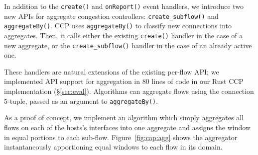 
%

 In addition to the \texttt{create()} and \texttt{onReport()} event handlers, we introduce two new APIs for aggregate congestion controllers: \texttt{create\_subflow()} and \texttt{aggregateBy()}.
CCP uses \texttt{aggregateBy()} to classify new connections into aggregates. Then, it calls either the existing \texttt{create()} handler in the case of a new aggregate, or the \texttt{create\_subflow()} handler in the case of an already active one.

These handlers are natural extensions of the existing per-flow API; we implemented API support for aggregation in $80$ lines of code in our Rust CCP implementation (\S\ref{sec:eval}).
Algorithms can aggregate flows using the connection 5-tuple, passed as an argument to \texttt{aggregateBy()}.

As a proof of concept, we implement an algorithm which simply aggregates all flows on each of the hosts's interfaces into one aggregate and assigns the window in equal portions to each sub-flow.
Figure~\ref{fig:cap:agg} shows the aggregator instantaneously apportioning equal windows to each flow in its domain.

